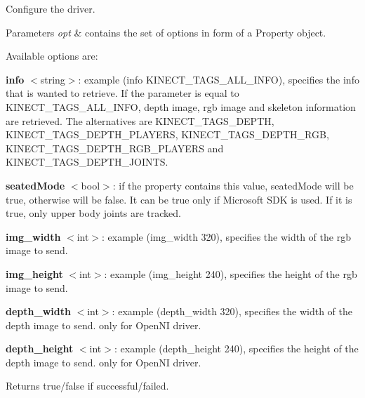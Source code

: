 Configure the driver. 


\begin{DoxyParams}{Parameters}
{\em opt} & contains the set of options in form of a Property object.\\
\hline
\end{DoxyParams}
Available options are\+:

{\bfseries info} $<$string$>$\+: example (info K\+I\+N\+E\+C\+T\+\_\+\+T\+A\+G\+S\+\_\+\+A\+L\+L\+\_\+\+I\+N\+FO), specifies the info that is wanted to retrieve. If the parameter is equal to K\+I\+N\+E\+C\+T\+\_\+\+T\+A\+G\+S\+\_\+\+A\+L\+L\+\_\+\+I\+N\+FO, depth image, rgb image and skeleton information are retrieved. The alternatives are K\+I\+N\+E\+C\+T\+\_\+\+T\+A\+G\+S\+\_\+\+D\+E\+P\+TH, K\+I\+N\+E\+C\+T\+\_\+\+T\+A\+G\+S\+\_\+\+D\+E\+P\+T\+H\+\_\+\+P\+L\+A\+Y\+E\+RS, K\+I\+N\+E\+C\+T\+\_\+\+T\+A\+G\+S\+\_\+\+D\+E\+P\+T\+H\+\_\+\+R\+GB, K\+I\+N\+E\+C\+T\+\_\+\+T\+A\+G\+S\+\_\+\+D\+E\+P\+T\+H\+\_\+\+R\+G\+B\+\_\+\+P\+L\+A\+Y\+E\+RS and K\+I\+N\+E\+C\+T\+\_\+\+T\+A\+G\+S\+\_\+\+D\+E\+P\+T\+H\+\_\+\+J\+O\+I\+N\+TS.

{\bfseries seated\+Mode} $<$bool$>$\+: if the property contains this value, seated\+Mode will be true, otherwise will be false. It can be true only if Microsoft S\+DK is used. If it is true, only upper body joints are tracked.

{\bfseries img\+\_\+width} $<$int$>$\+: example (img\+\_\+width 320), specifies the width of the rgb image to send.

{\bfseries img\+\_\+height} $<$int$>$\+: example (img\+\_\+height 240), specifies the height of the rgb image to send.

{\bfseries depth\+\_\+width} $<$int$>$\+: example (depth\+\_\+width 320), specifies the width of the depth image to send. only for Open\+NI driver.

{\bfseries depth\+\_\+height} $<$int$>$\+: example (depth\+\_\+height 240), specifies the height of the depth image to send. only for Open\+NI driver.

\begin{DoxyReturn}{Returns}
true/false if successful/failed. 
\end{DoxyReturn}
